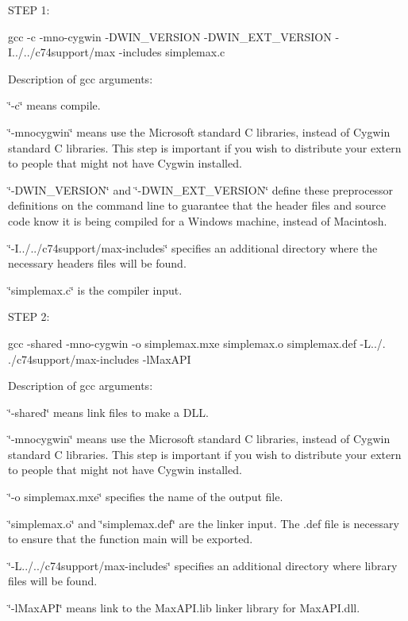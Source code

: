 STEP 1: 
\begin{DoxyCode}
        gcc -c -mno-cygwin -DWIN_VERSION -DWIN_EXT_VERSION -I../../c74support/max
      -includes simplemax.c
\end{DoxyCode}


Description of gcc arguments:

\char`\"{}-\/c\char`\"{} means compile.

\char`\"{}-\/mnocygwin\char`\"{} means use the Microsoft standard C libraries, instead of Cygwin standard C libraries. This step is important if you wish to distribute your extern to people that might not have Cygwin installed.

\char`\"{}-\/DWIN\_\-VERSION\char`\"{} and \char`\"{}-\/DWIN\_\-EXT\_\-VERSION\char`\"{} define these preprocessor definitions on the command line to guarantee that the header files and source code know it is being compiled for a Windows machine, instead of Macintosh.

\char`\"{}-\/I../../c74support/max-\/includes\char`\"{} specifies an additional directory where the necessary headers files will be found.

\char`\"{}simplemax.c\char`\"{} is the compiler input.

STEP 2: 
\begin{DoxyCode}
        gcc -shared -mno-cygwin -o simplemax.mxe simplemax.o simplemax.def -L../.
      ./c74support/max-includes -lMaxAPI
\end{DoxyCode}


Description of gcc arguments:

\char`\"{}-\/shared\char`\"{} means link files to make a DLL.

\char`\"{}-\/mnocygwin\char`\"{} means use the Microsoft standard C libraries, instead of Cygwin standard C libraries. This step is important if you wish to distribute your extern to people that might not have Cygwin installed.

\char`\"{}-\/o simplemax.mxe\char`\"{} specifies the name of the output file.

\char`\"{}simplemax.o\char`\"{} and \char`\"{}simplemax.def\char`\"{} are the linker input. The .def file is necessary to ensure that the function main will be exported.

\char`\"{}-\/L../../c74support/max-\/includes\char`\"{} specifies an additional directory where library files will be found.

\char`\"{}-\/lMaxAPI\char`\"{} means link to the MaxAPI.lib linker library for MaxAPI.dll.

